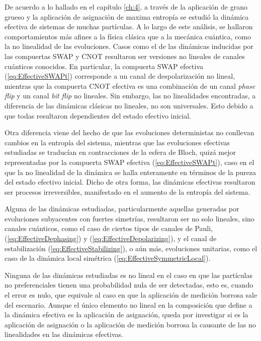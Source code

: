 De acuerdo a lo hallado en el capítulo \ref{ch:4}, a través de la aplicación de grano grueso y la aplicación de asignación de maxima entropía se estudió la dinámica efectiva de sistemas de muchas partículas. A lo largo de este análisis, se hallaron comportamientos más afines a la física clásica que a la mecánica cuántica, como la no linealidad de las evoluciones. Casos como el de las dinámicas inducidas por las compuertas SWAP y CNOT resultaron ser versiones no lineales de canales cuánticos conocidos. En particular, la compuerta SWAP efectiva (\ref{eq:EffectiveSWAPt}) corresponde a un canal de despolarización no lineal, mientras que la compuerta CNOT efectiva es una combinación de un canal \textit{phase flip} y un canal \textit{bit flip} no lineales. Sin embargo, las no linealidades encontradas, a diferencia de las dinámicas clásicas no lineales, no son universales. Esto debido a que todas resultaron dependientes del estado efectivo inicial. 
%

Otra diferencia viene del hecho de que las evoluciones deterministas \acnote{\checkmark} no conllevan cambios en la entropía del sistema, mientras que las evoluciones efectivas estudiadas se traducían en contracciones de la esfera de Bloch, quizá mejor representadas por la compuerta SWAP efectiva (\ref{eq:EffectiveSWAPt}), caso en el que la no linealidad de la dinámica se halla enteramente en términos de la pureza del estado efectivo inicial. Dicho de otra forma, las dinámicas efectivas resultaron ser procesos irreversibles, manifestado en el aumento de la entropía del sistema. \acnote{\checkmark}

Alguna de las dinámicas estudiadas, particularmente aquellas generadas por evoluciones subyacentes con fuertes simetrías, resultaron ser no solo lineales, sino canales cuánticos, como el caso de ciertos tipos de canales de Pauli, (\ref{eq:EffectiveDephasing}) y (\ref{eq:EffectiveDepolarizing}), y el canal de estabilización (\ref{eq:EffectiveStabilizing}), o aún más, evoluciones unitarias, como el caso de la dinámica local simétrica (\ref{eq:EffectiveSymmetricLocal}). 

Ninguna de las dinámicas estudiadas es no lineal en el caso en que las partículas no preferenciales tienen una probabilidad nula de ser detectadas, esto es, cuando el error es nulo, que equivale al caso en que la aplicación de medición borrosa sale del escenario. Aunque el único elemento no lineal en la composición que define a la dinámica efectiva es la aplicación de asignación, queda por investigar si es la aplicación de asignación o la aplicación de medición borrosa la causante de las no linealidades en las dinámicas efectivas.


